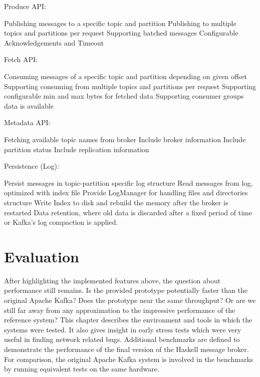 Produce API:
\begin{itemize}
        \tick Publishing messages to a specific topic and partition
        \tick Publishing to multiple topics and partitions per request
        \tick Supporting batched messages
        \fail Configurable Acknowledgements and Timeout
\end{itemize}

Fetch API:
\begin{itemize}
        \tick Consuming messages of a specific topic and partition depending on given offset
        \fail Supporting consuming from multiple topics and partitions per request
        \fail Supporting configurable min and max bytes for fetched data
        \fail Supporting consumer groups
        data is available
\end{itemize}

Metadata API:
\begin{itemize}
        \tick Fetching available topic names from broker
        \tick Include broker information
        \fail Include partition status
        \fail Include replication information
\end{itemize}

Persistence (Log):
\begin{itemize}
        \tick Persist messages in topic-partition specific log structure
        \tick Read messages from log, optimized with index file
        \tick Provide LogManager for handling files and directories structure
        \fail Write Index to disk and rebuild the memory after the broker is restarted
        \fail Data retention, where old data is discarded after a fixed period of
            time or Kafka's log compaction is applied. 
\end{itemize}

\newpage
\section{Evaluation}

After highlighting the implemented features above, the question about
performance still remains. Is the provided prototype potentially faster than the
original Apache Kafka? Does the prototype near the same throughput? Or are we still far
away from any approximation to the impressive performance of the reference
system? This chapter describes the environment and tools in which the systems
were tested. It also gives insight in early stress tests which were very useful
in finding network related bugs. Additional benchmarks are defined to
demonstrate the performance of the final version of the Haskell message broker.
For comparison, the original Apache Kafka system is involved in the benchmarks
by running equivalent tests on the same hardware.

